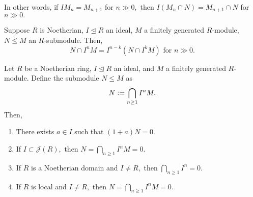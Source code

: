 \documentclass[12pt]{article}	%
\begin{document}
In other words, if $IM_n = M_{n + 1}$ for $n \gg 0,$ then $I(M_n \cap N) = M_{n + 1} \cap N$ for $n \gg 0.$

\begin{cor}
	Suppose $R$ is Noetherian, $I \unlhd R$ an ideal, $M$ a finitely generated $R$-module, $N \le M$ an $R$-submodule. Then, 
	\begin{equation*} 
		N \cap I^nM = I^{n - k}(N \cap I^kM) \text{ for } n \gg 0.
	\end{equation*}
\end{cor}

\begin{thm}
	Let $R$ be a Noetherian ring, $I \unlhd R$ an ideal, and $M$ a finitely generated $R$-module. Define the submodule $N \le M$ as
	\begin{equation*} 
		N \vcentcolon= \bigcap_{n \ge 1} I^nM.
	\end{equation*}
	Then,
	\begin{enumerate}
		\item There exists $a \in I$ such that $(1 + a)N = 0.$
		\item If $I \subset \mathcal{J}(R),$ then $N = \bigcap_{n \ge 1}I^nM = 0.$
		\item If $R$ is a Noetherian domain and $I \neq R,$ then $\bigcap_{n \ge 1}I^n = 0.$
		\item If $R$ is local and $I \neq R,$ then $N = \bigcap_{n \ge 1}I^nM = 0.$
	\end{enumerate}
\end{thm}
\end{document}
